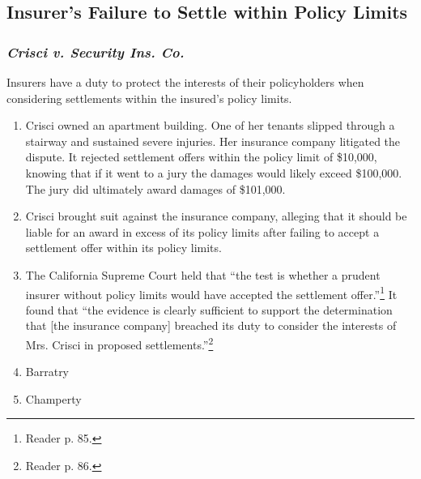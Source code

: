 \subsection{Insurer's Failure to Settle within Policy Limits}

\subsubsection{\emph{Crisci v. Security Ins. Co.}}

Insurers have a duty to protect the interests of their policyholders when 
considering settlements within the insured's policy limits.

\begin{enumerate}
    \item Crisci owned an apartment building. One of her tenants slipped 
    through a stairway and sustained severe injuries. Her insurance company 
    litigated the dispute. It rejected settlement offers within the policy 
    limit of \$10,000, knowing that if it went to a jury the damages would 
    likely exceed \$100,000. The jury did ultimately award damages of 
    \$101,000.
    \item Crisci brought suit against the insurance company, alleging that it 
    should be liable for an award in excess of its policy limits after failing 
    to accept a settlement offer within its policy limits.\
    \item The California Supreme Court held that ``the test is whether a 
    prudent insurer without policy limits would have accepted the settlement 
    offer.''\footnote{Reader p. 85.} It found that ``the evidence is 
    clearly sufficient to support the determination that [the insurance 
    company] breached its duty to consider the interests of Mrs. Crisci in 
    proposed settlements.''\footnote{Reader p. 86.}

    \item Barratry
    \item Champerty
\end{enumerate}
